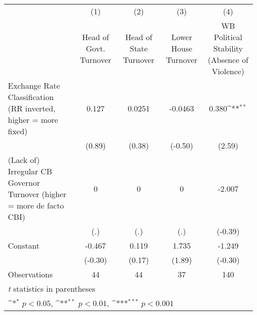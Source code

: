 {
\def\sym#1{\ifmmode^{#1}\else\(^{#1}\)\fi}
\begin{tabular*}{\linewidth}{@{\hskip\tabcolsep\extracolsep\fill}l*{4}{c}}
\toprule
                &\multicolumn{1}{c}{(1)}&\multicolumn{1}{c}{(2)}&\multicolumn{1}{c}{(3)}&\multicolumn{1}{c}{(4)}\\
                &\multicolumn{1}{c}{Head of Govt. Turnover}&\multicolumn{1}{c}{Head of State Turnover}&\multicolumn{1}{c}{Lower House Turnover}&\multicolumn{1}{c}{WB Political Stability (Absence of Violence)}\\
\midrule
Exchange Rate Classification (RR inverted, higher = more fixed)&    0.127         &   0.0251         &  -0.0463         &    0.380\sym{**} \\
                &   (0.89)         &   (0.38)         &  (-0.50)         &   (2.59)         \\
\addlinespace
(Lack of) Irregular CB Governor Turnover (higher = more de facto CBI)&        0         &        0         &        0         &   -2.007         \\
                &      (.)         &      (.)         &      (.)         &  (-0.39)         \\
\addlinespace
Constant        &   -0.467         &    0.119         &    1.735         &   -1.249         \\
                &  (-0.30)         &   (0.17)         &   (1.89)         &  (-0.30)         \\
\midrule
Observations    &       44         &       44         &       37         &      140         \\
\bottomrule
\multicolumn{5}{l}{\footnotesize \textit{t} statistics in parentheses}\\
\multicolumn{5}{l}{\footnotesize \sym{*} \(p<0.05\), \sym{**} \(p<0.01\), \sym{***} \(p<0.001\)}\\
\end{tabular*}
}
